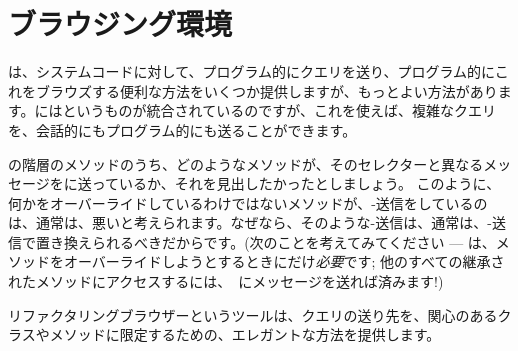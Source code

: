 \documentclass[a4paper,10pt,twoside]{book}
\begin{document}
\section{ブラウジング環境}

は、システムコードに対して、プログラム的にクエリを送り、プログラム的にこれをブラウズする便利な方法をいくつか提供しますが、もっとよい方法があります。\pharo にはというものが統合されているのですが、これを使えば、複雑なクエリを、会話的にもプログラム的にも送ることができます。

の階層のメソッドのうち、どのようなメソッドが、そのセレクターと異なるメッセージを\super に送っているか、それを見出したかったとしましょう。
このように、何かをオーバーライドしているわけではないメソッドが、\super-送信をしているのは、通常は、悪いと考えられます。なぜなら、そのような\super-送信は、通常は、\self-送信で置き換えられるべきだからです。(次のことを考えてみてください --- \super は、メソッドをオーバーライドしようとするときにだけ\emph{必要}です; 他のすべての継承されたメソッドにアクセスするには、\self　にメッセージを送れば済みます!)

リファクタリングブラウザーというツールは、クエリの送り先を、関心のあるクラスやメソッドに限定するための、エレガントな方法を提供します。
\end{document}
